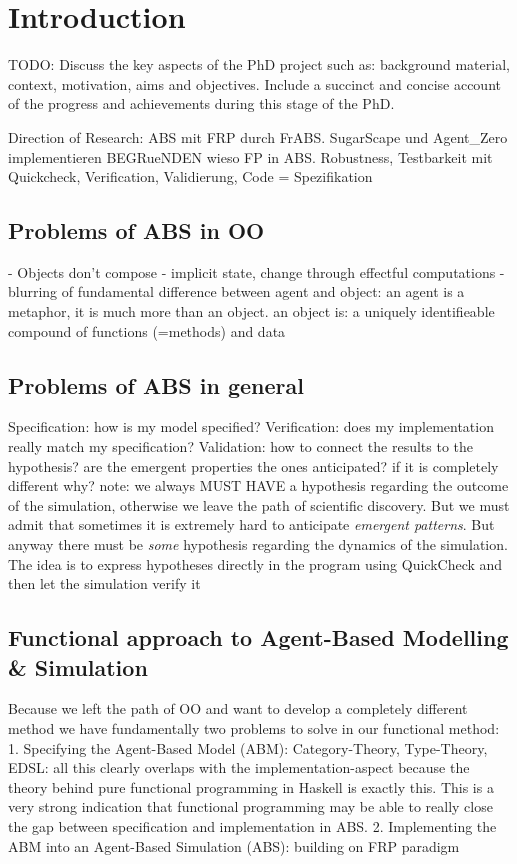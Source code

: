 \section{Introduction}
TODO: Discuss the key aspects of the PhD project such as: background material, context, motivation, aims and objectives. Include a succinct and concise account of the progress and achievements during this stage of the PhD.

Direction of Research:
ABS mit FRP durch FrABS. SugarScape und Agent\_Zero implementieren
BEGRueNDEN wieso FP in ABS. Robustness, Testbarkeit mit Quickcheck, Verification, Validierung, Code = Spezifikation

\subsection{Problems of ABS in OO}
- Objects don't compose
- implicit state, change through effectful computations
- blurring of fundamental difference between agent and object: an agent is a metaphor, it is much more than an object. an object is: a uniquely identifieable compound of functions (=methods) and data

\subsection{Problems of ABS in general}
Specification: how is my model specified? 
Verification: does my implementation really match my specification? 
Validation: how to connect the results to the hypothesis? are the emergent properties the ones anticipated? if it is completely different why? note: we always MUST HAVE a hypothesis regarding the outcome of the simulation, otherwise we leave the path of scientific discovery. But we must admit that sometimes it is extremely hard to anticipate \textit{emergent patterns}. But anyway there must be \textit{some} hypothesis regarding the dynamics of the simulation.
The idea is to express hypotheses directly in the program using QuickCheck and then let the simulation verify it

\subsection{Functional approach to Agent-Based Modelling \& Simulation}
Because we left the path of OO and want to develop a completely different method we have fundamentally two problems to solve in our functional method:
1. Specifying the Agent-Based Model (ABM): Category-Theory, Type-Theory, EDSL: all this clearly overlaps with the  implementation-aspect because the theory behind pure functional programming in Haskell is exactly this. This is a very strong indication that functional programming may be able to really close the gap between specification and implementation in ABS.
2. Implementing the ABM into an Agent-Based Simulation (ABS): building on FRP paradigm

